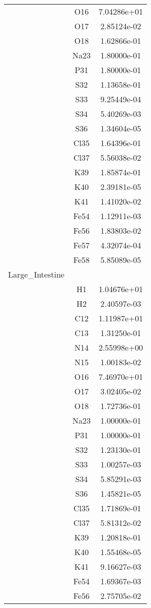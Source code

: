 \begin{centering}
\begin{longtable}{l c c}
& O16 & 7.04286e+01 \\ 
& O17 & 2.85124e-02 \\ 
& O18 & 1.62866e-01 \\ 
& Na23 & 1.80000e-01 \\ 
& P31 & 1.80000e-01 \\ 
& S32 & 1.13658e-01 \\ 
& S33 & 9.25449e-04 \\ 
& S34 & 5.40269e-03 \\ 
& S36 & 1.34604e-05 \\ 
& Cl35 & 1.64396e-01 \\ 
& Cl37 & 5.56038e-02 \\ 
& K39 & 1.85874e-01 \\ 
& K40 & 2.39181e-05 \\ 
& K41 & 1.41020e-02 \\ 
& Fe54 & 1.12911e-03 \\ 
& Fe56 & 1.83803e-02 \\ 
& Fe57 & 4.32074e-04 \\ 
& Fe58 & 5.85089e-05 \\ 
\hline
Large\_Intestine & & \\
\hline
& H1 & 1.04676e+01 \\ 
& H2 & 2.40597e-03 \\ 
& C12 & 1.11987e+01 \\ 
& C13 & 1.31250e-01 \\ 
& N14 & 2.55998e+00 \\ 
& N15 & 1.00183e-02 \\ 
& O16 & 7.46970e+01 \\ 
& O17 & 3.02405e-02 \\ 
& O18 & 1.72736e-01 \\ 
& Na23 & 1.00000e-01 \\ 
& P31 & 1.00000e-01 \\ 
& S32 & 1.23130e-01 \\ 
& S33 & 1.00257e-03 \\ 
& S34 & 5.85291e-03 \\ 
& S36 & 1.45821e-05 \\ 
& Cl35 & 1.71869e-01 \\ 
& Cl37 & 5.81312e-02 \\ 
& K39 & 1.20818e-01 \\ 
& K40 & 1.55468e-05 \\ 
& K41 & 9.16627e-03 \\ 
& Fe54 & 1.69367e-03 \\ 
& Fe56 & 2.75705e-02 \\ 

\end{longtable}
\end{centering}
